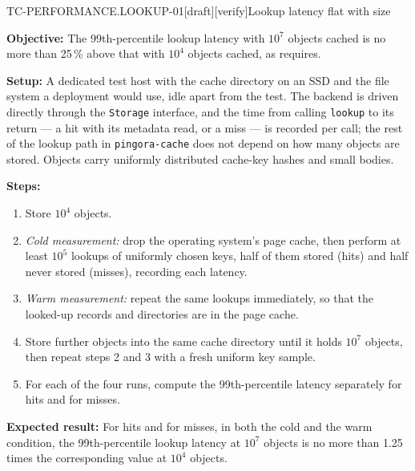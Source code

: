 \begin{requirement}{TC-PERFORMANCE.LOOKUP-01}[draft][verify]{Lookup latency flat with size}


  \textbf{Objective:} The 99th-percentile lookup latency with $10^7$ objects
  cached is no more than 25\,\% above that with $10^4$ objects cached, as
   requires.

  \textbf{Setup:} A dedicated test host with the cache directory on an SSD and
  the file system a deployment would use, idle apart from the test. The
  backend is driven directly through the \texttt{Storage} interface, and the
  time from calling \texttt{lookup} to its return --- a hit with its metadata
  read, or a miss --- is recorded per call; the rest of the lookup path in
  \texttt{pingora-cache} does not depend on how many objects are stored. Objects carry
  uniformly distributed cache-key hashes and small bodies.

  \textbf{Steps:}
  \begin{enumerate}
    \item Store $10^4$ objects.
    \item \emph{Cold measurement:} drop the operating system's page cache,
      then perform at least $10^5$ lookups of uniformly chosen keys, half of
      them stored (hits) and half never stored (misses), recording each
      latency.
    \item \emph{Warm measurement:} repeat the same lookups immediately, so
      that the looked-up records and directories are in the page cache.
    \item Store further objects into the same cache directory until it holds
      $10^7$ objects, then repeat steps 2 and 3 with a fresh uniform key
      sample.
    \item For each of the four runs, compute the 99th-percentile latency
      separately for hits and for misses.
  \end{enumerate}

  \textbf{Expected result:} For hits and for misses, in both the cold and the
  warm condition, the 99th-percentile lookup latency at $10^7$ objects is no
  more than 1.25 times the corresponding value at $10^4$ objects.



\end{requirement}

